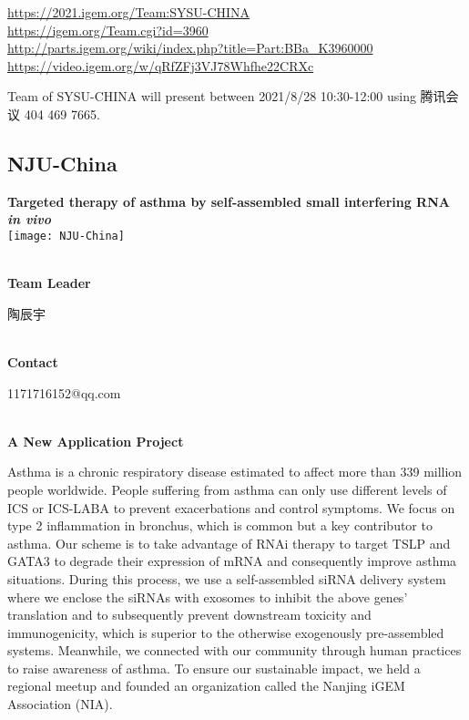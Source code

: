 \url{https://2021.igem.org/Team:SYSU-CHINA }\\
\url{https://igem.org/Team.cgi?id=3960 }\\
\url{http://parts.igem.org/wiki/index.php?title=Part:BBa_K3960000 }\\
\url{https://video.igem.org/w/qRfZFj3VJ78Whfhe22CRXc }\\

\vfill{}









Team of SYSU-CHINA will present between     2021/8/28 10:30-12:00    using 腾讯会议 404 469 7665.
\newpage


\subsection{\textcolor{Blu}{ NJU-China } }
\vspace{5mm}
\begin{center}
\large{
  \textbf{ Targeted therapy of asthma by self-assembled small interfering RNA \textit{in vivo} }\\

  \texttt{[image: NJU-China]}
}
\end{center}
\textbf{\\Team Leader}

  陶辰宇


\textbf{\\Contact}

  1171716152@qq.com


\textbf{\\A New Application Project\\}\begin{spacing}{1.5}

Asthma is a chronic respiratory disease estimated to affect more than 339 million people worldwide. People suffering from asthma can only use different levels of ICS or ICS-LABA to prevent exacerbations and control symptoms. We focus on type 2 inflammation in bronchus, which is common but a key contributor to asthma. Our scheme is to take advantage of RNAi therapy to target TSLP and GATA3 to degrade their expression of mRNA and consequently improve asthma situations. During this process, we use a self-assembled siRNA delivery system where we enclose the siRNAs with exosomes to inhibit the above genes' translation and to subsequently prevent downstream toxicity and immunogenicity, which is superior to the otherwise exogenously pre-assembled systems. Meanwhile, we connected with our community through human practices to raise awareness of asthma. To ensure our sustainable impact, we held a regional meetup and founded an organization called the Nanjing iGEM Association (NIA).\end{spacing}
\\

